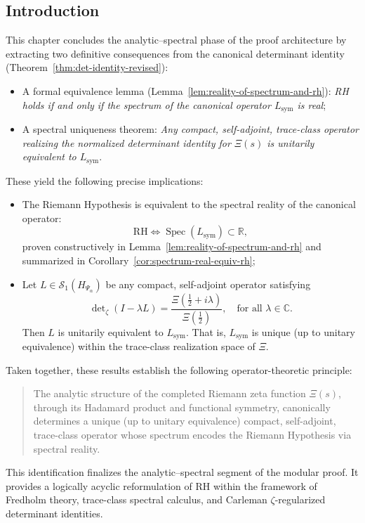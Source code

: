 \subsection*{Introduction}

This chapter concludes the analytic–spectral phase of the proof architecture by extracting two definitive consequences from the canonical determinant identity (Theorem~\ref{thm:det-identity-revised}):

\begin{itemize}
  \item A formal equivalence lemma (Lemma~\ref{lem:reality-of-spectrum-and-rh}): \emph{RH holds if and only if the spectrum of the canonical operator \( L_{\mathrm{sym}} \) is real};

  \item A spectral uniqueness theorem: \emph{Any compact, self-adjoint, trace-class operator realizing the normalized determinant identity for \( \Xi(s) \) is unitarily equivalent to \( L_{\mathrm{sym}} \)}.
\end{itemize}

\medskip

These yield the following precise implications:

\begin{itemize}
  \item The Riemann Hypothesis is equivalent to the spectral reality of the canonical operator:
  \[
  \mathrm{RH} \iff \operatorname{Spec}(L_{\mathrm{sym}}) \subset \mathbb{R},
  \]
  proven constructively in Lemma~\ref{lem:reality-of-spectrum-and-rh} and summarized in Corollary~\ref{cor:spectrum-real-equiv-rh};

  \item Let \( L \in \mathcal{S}_1(H_{\Psi_\alpha}) \) be any compact, self-adjoint operator satisfying
  \[
  \det\nolimits_\zeta(I - \lambda L) = \frac{\Xi(\tfrac{1}{2} + i\lambda)}{\Xi(\tfrac{1}{2})}, \quad \text{for all } \lambda \in \mathbb{C}.
  \]
  Then \( L \) is unitarily equivalent to \( L_{\mathrm{sym}} \). That is, \( L_{\mathrm{sym}} \) is unique (up to unitary equivalence) within the trace-class realization space of \( \Xi \).
\end{itemize}

\medskip

Taken together, these results establish the following operator-theoretic principle:

\begin{quote}
  The analytic structure of the completed Riemann zeta function \( \Xi(s) \), through its Hadamard product and functional symmetry, canonically determines a unique (up to unitary equivalence) compact, self-adjoint, trace-class operator whose spectrum encodes the Riemann Hypothesis via spectral reality.
\end{quote}

This identification finalizes the analytic–spectral segment of the modular proof. It provides a logically acyclic reformulation of RH within the framework of Fredholm theory, trace-class spectral calculus, and Carleman \(\zeta\)-regularized determinant identities.
